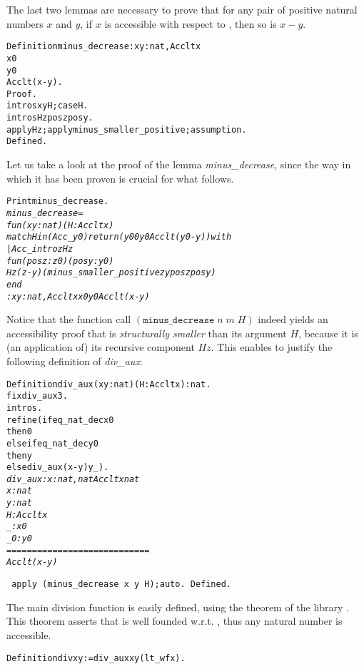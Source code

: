 \documentclass[11pt]{article}
\begin{document}
\noindent The last two lemmas are necessary to prove that for any pair
of positive natural numbers $x$ and $y$, if $x$ is accessible with
respect to , then so is $x-y$.

\begin{alltt}
Definition minus_decrease : {\prodsym} x y:nat, Acc lt x {\arrow} 
                                         x {\coqdiff} 0 {\arrow} 
                                         y {\coqdiff} 0 {\arrow}
                                         Acc lt (x-y).
Proof.
 intros x y H; case H.
 intros Hz posz posy. 
 apply Hz; apply minus_smaller_positive; assumption.
Defined.
\end{alltt}

Let us take a look at the proof of the lemma \textsl{minus\_decrease}, since
the way in which it has been proven is crucial for what follows.
\begin{alltt}
Print minus_decrease.
\it
minus_decrease = 
fun (x y : nat) (H : Acc lt x) {\funarrow}
match H in (Acc _ y0) return (y0 {\coqdiff} 0 {\arrow} y {\coqdiff} 0 {\arrow} Acc lt (y0 - y)) with
| Acc_intro z Hz {\funarrow}
    fun (posz : z {\coqdiff} 0) (posy : y {\coqdiff} 0) {\funarrow}
    Hz (z - y) (minus_smaller_positive z y posz posy)
end
     : {\prodsym} x y : nat, Acc lt x {\arrow} x {\coqdiff} 0 {\arrow} y {\coqdiff} 0 {\arrow} Acc lt (x - y)

\end{alltt}
\noindent Notice that the function call 
$(\texttt{minus\_decrease}\;n\;m\;H)$
indeed yields an accessibility proof that is \textsl{structurally
smaller} than its argument $H$, because it is (an application of) its
recursive component $Hz$.  This enables to justify the following
definition of \textsl{div\_aux}:

\begin{alltt}
Definition div_aux (x y:nat)(H: Acc lt x):nat.
 fix div_aux 3.
 intros.
 refine (if eq_nat_dec x 0 
         then 0 
         else if eq_nat_dec y 0 
              then y
              else div_aux (x-y) y _).
\it
 div_aux : {\prodsym} x : nat, nat {\arrow} Acc lt x {\arrow} nat
  x : nat
  y : nat
  H : Acc lt x
  _ : x {\coqdiff} 0
  _0 : y {\coqdiff} 0
  ============================
   Acc lt (x - y)

\tt
 apply (minus_decrease x y H);auto. 
Defined.
\end{alltt}

The main division function is easily defined, using the theorem
 of the library . This theorem asserts that
 is well founded w.r.t. , thus any natural number
is accessible.
\begin{alltt}
Definition div x y := div_aux x y (lt_wf x). 
\end{alltt}
\end{document}
